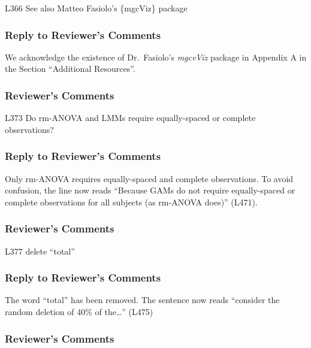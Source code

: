 \documentclass[
]{article}
\begin{document}
L366 See also Matteo Fasiolo's \{mgcViz\} package

\hypertarget{section-31}{%
\subsubsection{\texorpdfstring{\textcolor{reviewersblue} {Reply to Reviewer's Comments}}{}}\label{section-31}}

We acknowledge the existence of Dr.~Fasiolo's \emph{mgcvViz} package in Appendix A in the Section ``Additional Resources''.

\hypertarget{reviewers-comments-31}{%
\subsubsection{Reviewer's Comments}\label{reviewers-comments-31}}

L373 Do rm-ANOVA and LMMs require equally-spaced or complete observations?

\hypertarget{section-32}{%
\subsubsection{\texorpdfstring{\textcolor{reviewersblue} {Reply to Reviewer's Comments}}{}}\label{section-32}}

Only rm-ANOVA requires equally-spaced and complete observations. To avoid confusion, the line now reads ``Because GAMs do not require equally-spaced or complete observations for all subjects (as rm-ANOVA does)'' (L471).

\hypertarget{reviewers-comments-32}{%
\subsubsection{Reviewer's Comments}\label{reviewers-comments-32}}

L377 delete ``total''

\hypertarget{section-33}{%
\subsubsection{\texorpdfstring{\textcolor{reviewersblue} {Reply to Reviewer's Comments}}{}}\label{section-33}}

The word ``total'' has been removed. The sentence now reads ``consider the random deletion of 40\% of the\ldots{}'' (L475)

\hypertarget{reviewers-comments-33}{%
\subsubsection{Reviewer's Comments}\label{reviewers-comments-33}}
\end{document}
